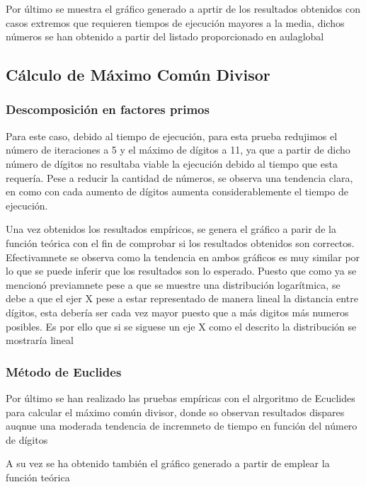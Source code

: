 Por último se muestra el gráfico generado a aprtir de los resultados obtenidos con casos extremos que requieren tiempos de ejecución mayores a la media, dichos números se han obtenido a partir del listado proporcionado en aulaglobal
\begin{figure}[H]
\end{figure}




\subsection{Cálculo de Máximo Común Divisor}

\subsubsection{Descomposición en factores primos}
Para este caso, debido al tiempo de ejecución, para esta prueba redujimos el número de iteraciones a 5 y el máximo de dígitos a 11, ya que  a partir de dicho número de dígitos no resultaba viable la ejecución debido al tiempo que esta requería. Pese a reducir la cantidad de números, se observa una tendencia clara, en como con cada aumento de dígitos aumenta considerablemente el tiempo de ejecución.
\begin{figure}[H]
\end{figure}

Una vez obtenidos los resultados empíricos, se genera el gráfico a parir de la función teórica con el fin de comprobar si los resultados obtenidos son correctos. Efectivamnete se observa como la tendencia en ambos gráficos es muy similar por lo que se puede inferir que los resultados son lo esperado. Puesto que como ya se mencionó previamnete pese a que se muestre una distribución logarítmica, se debe a que el ejer X pese a estar representado de manera lineal la distancia entre dígitos, esta debería ser cada vez mayor puesto que a más digitos más numeros posibles. Es por ello que si se siguese un eje X como el descrito la distribución se mostraría lineal
\begin{figure}[H]
\end{figure}



\subsubsection{Método de Euclides}
Por último se han realizado las pruebas empíricas con el alrgoritmo de Ecuclides para calcular el máximo común divisor, donde so observan resultados dispares auqnue una moderada tendencia de incremneto de tiempo en función del número de dígitos
\begin{figure}[H]
\end{figure}

A su vez se ha obtenido también el gráfico generado a partir de emplear la función teórica
\begin{figure}[H]
\end{figure}
